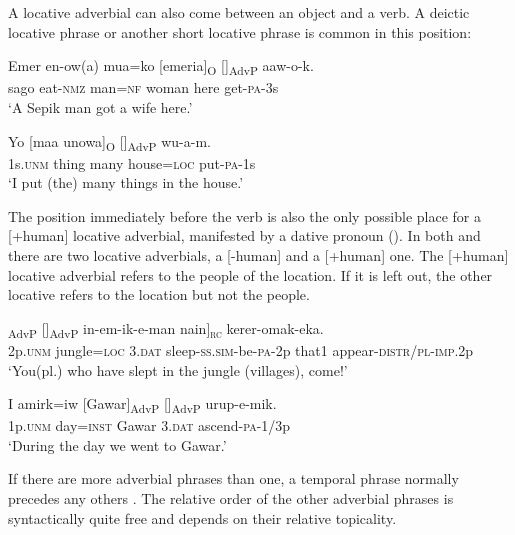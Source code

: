 A locative adverbial can also come between an object  and a verb. A deictic locative phrase or another short locative phrase is common in this position:

\ea%
\label{ex:5:x914}
\gll Emer  en-ow(a)  mua=ko  [emeria]\textsubscript{O}  []\textsubscript{AdvP}  aaw-o-k. \\
     sago  eat-\textsc{nmz}  man=\textsc{nf}  woman  here  get-\textsc{pa}-3s \\
\glt `A Sepik man got a wife here.'
\z

\ea%
\label{ex:5:x931}
\gll Yo  [maa  unowa]\textsubscript{O}  []\textsubscript{AdvP}  wu-a-m. \\
     1s.\textsc{unm}  thing  many  house=\textsc{loc}  put-\textsc{pa}-1s \\
\glt `I put (the) many things in the house.'
\z

The position immediately before the verb is also the only possible place for a [+human] locative adverbial, manifested by a dative pronoun (). In both  and  there are two locative adverbials, a [-human] and a [+human] one. The [+human] locative adverbial refers to the people of the location. If it is left out, the other locative refers to the location but not the people. 

\ea%
\label{ex:5:x854}
\gll [Ni  [koka-pa]\textsubscript{AdvP}  []\textsubscript{AdvP}  in-em-ik-e-man nain]\textsubscript{\textsc{rc}} kerer-omak-eka. \\
     2p.\textsc{unm}  jungle=\textsc{loc}  3.\textsc{dat}  sleep-\textsc{ss}.\textsc{sim}-be-\textsc{pa}-2p that1 appear-\textsc{distr}/\textsc{pl}-\textsc{imp}.2p \\
\glt `You(pl.) who have slept in the jungle (villages), come!' 
\z

\ea%
\label{ex:5:x855}
\gll I  amirk=iw  [Gawar]\textsubscript{AdvP}  []\textsubscript{AdvP}  urup-e-mik. \\
     1p.\textsc{unm}  day=\textsc{inst}  Gawar  3.\textsc{dat}  ascend-\textsc{pa}-1/3p \\
\glt `During the day we went to Gawar.'
\z

If there are more adverbial phrases than one, a temporal phrase normally precedes any others .  The relative order of the other adverbial phrases is syntactically quite free and depends on their relative topicality.

